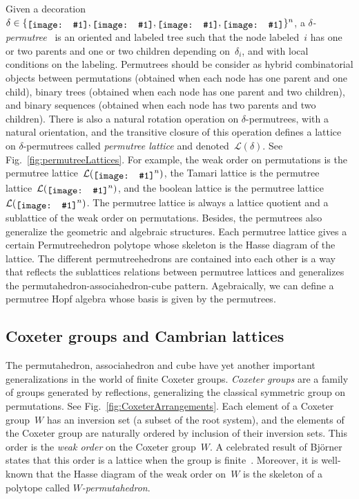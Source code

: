 \documentclass[a4paper,12pt]{article}
\newcommand{\cL}{\mathcal{L}} %
\newcommand{\defn}[1]{\emph{\color{blue} #1}} %
\newcommand{\includeSymbol}[1]{\ensuremath{%
	\mathchoice
		{\raisebox{-.7mm}{\texttt{[image: \#1]}}}	
		{\raisebox{-.7mm}{\texttt{[image: \#1]}}}
		{\raisebox{-.6mm}{\texttt{[image: \#1]}}}
		{\raisebox{-.5mm}{\texttt{[image: \#1]}}}
}}
\newcommand{\noneCirc}{\includeSymbol{none}}
\newcommand{\upCirc}{\includeSymbol{up}}
\newcommand{\downCirc}{\includeSymbol{down}}
\newcommand{\upDownCirc}{\includeSymbol{updown}}
\newcommand{\Decorations}{\{\noneCirc{}, \downCirc{}, \upCirc{}, \upDownCirc{}\}} %
\begin{document}
Given a decoration~$\delta \in \Decorations^n$, a \defn{$\delta$-permutree}~\cite{PilaudPons-permutrees} is an oriented and labeled tree such that the node labeled~$i$ has one or two parents and one or two children depending on~$\delta_i$, and with local conditions on the labeling.
Permutrees should be consider as hybrid combinatorial objects between permutations (obtained when each node has one parent and one child), binary trees (obtained when each node has one parent and two children), and binary sequences (obtained when each node has two parents and two children).
There is also a natural rotation operation on $\delta$-permutrees, with a natural orientation, and the transitive closure of this operation defines a lattice on $\delta$-permutrees called \defn{permutree lattice} and denoted~$\cL(\delta)$.
See Fig.~\ref{fig:permutreeLattices}.
For example, the weak order on permutations is the permutree lattice~$\cL(\noneCirc^n)$, the Tamari lattice is the permutree lattice~$\cL(\downCirc^n)$, and the boolean lattice is the permutree lattice~$\cL(\upDownCirc^n)$.
The permutree lattice is always a lattice quotient and a sublattice of the weak order on permutations. Besides, the permutrees also generalize the geometric and algebraic structures. Each permutree lattice gives a certain Permutreehedron polytope whose skeleton is the Hasse diagram of the lattice. The different permutreehedrons are contained into each other is a way that reflects the sublattices relations between permutree lattices and generalizes the permutahedron-associahedron-cube pattern. Agebraically, we can define a permutree Hopf algebra whose basis is given by the permutrees.

\subsection{Coxeter groups and Cambrian lattices}

The permutahedron, associahedron and cube have yet another important generalizations in the world of finite Coxeter groups.
\defn{Coxeter groups} are a family of groups generated by reflections, generalizing the classical symmetric group on permutations.
See Fig.~\ref{fig:CoxeterArrangements}.
Each element of a Coxeter group~$W$ has an inversion set (a subset of the root system), and the elements of the Coxeter group are naturally ordered by inclusion of their inversion sets.
This order is the \defn{weak order} on the Coxeter group~$W$.
A celebrated result of Bj\"orner states that this order is a lattice when the group is finite~\cite{Bjorner}.
Moreover, it is well-known that the Hasse diagram of the weak order on~$W$ is the skeleton of a polytope called \defn{$W$-permutahedron}.
\end{document}

